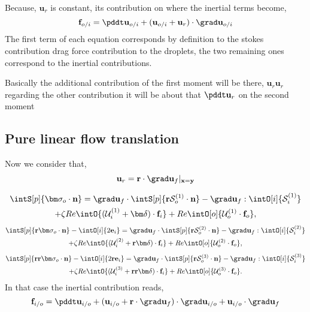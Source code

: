 Because, $\textbf{u}_r$ is constant, its contribution on
where the inertial terms become, 
\begin{equation}
    \textbf{f}_{o/i} = \pddt \textbf{u}_{o/i} + (\textbf{u}_{o/i} + \textbf{u}_r) \cdot \grad \textbf{u}_{o/i}
\end{equation}
The first term of each equation corresponds by definition to the stokes contribution drag force contribution to the droplets, the two remaining ones correspond to the inertial contributions. 

Basically the additional contribution of the first moment will be there, $\textbf{u}_r\textbf{u}_r$ regarding the other contribution it will be about that $\pddt \textbf{u}_r$ on the second moment 


\subsection{Pure linear flow translation}
Now we consider that, 
\begin{equation}
    \textbf{u}_r = \textbf{r}\cdot \grad \textbf{u}_f |_{\textbf{x}=\textbf{y}}
\end{equation}

\begin{multline}
    \intS[p]{\bm\sigma_{o}\cdot \textbf{n}}
    =
    \grad \textbf{u}_f\cdot \intS[p]{\textbf{r} \mathcal{S}_o^{(1)} \cdot \textbf{n}}
    - \grad\textbf{u}_f:\intO[i]{ \mathcal{S}_{i}^{(1)}}
    \\ 
    + \zeta Re \intO{(\mathcal{U}_{i}^{(1)} + \bm\delta)\cdot \textbf{f}_{i}} 
    + Re\intO[o]{\mathcal{U}_{o}^{(1)}\cdot \textbf{f}_{o}},
\end{multline}
\begin{multline}
    \intS[p]{\textbf{r}  \bm\sigma_{o}\cdot \textbf{n}}
    - \intO[i]{2\textbf{e}_i}
    =
    \grad \textbf{u}_f\cdot \intS[p]{\textbf{r}  \mathcal{S}_o^{(2)}\cdot \textbf{n}}
    - \grad\textbf{u}_f:\intO[i]{ \mathcal{S}_i^{(2)}}
    \\ 
    + \zeta Re \intO{(\mathcal{U}_{i}^{(2)}  + \textbf{r}\bm\delta)\cdot \textbf{f}_{i}} 
    + Re\intO[o]{\mathcal{U}_{o}^{(2)}\cdot \textbf{f}_{o}},
\end{multline}
\begin{multline}
    \intS[p]{\textbf{rr}  \bm\sigma_{o}\cdot \textbf{n}}
    - \intO[i]{2\textbf{re}_i }
    =
    \grad \textbf{u}_f\cdot \intS[p]{\textbf{r} \mathcal{S}_o^{(3)}\cdot \textbf{n}}
    - \grad\textbf{u}_f:\intO[i]{\mathcal{S}_i^{(3)}}\\
    + \zeta Re \intO{(\mathcal{U}_{i}^{(3)} + \textbf{rr}\bm\delta)\cdot \textbf{f}_{i}} 
    + Re\intO[o]{\mathcal{U}_{o}^{(3)} \cdot \textbf{f}_{o}}.
\end{multline}
In that case the inertial contribution reads, 
\begin{equation}
    \textbf{f}_{i/o} 
    =
    \pddt \textbf{u}_{i/o}
    + (\textbf{u}_{i/o} + \textbf{r}\cdot \grad \textbf{u}_f)\cdot \grad \textbf{u}_{i/o}
    + \textbf{u}_{i/o}\cdot \grad \textbf{u}_f
\end{equation}
